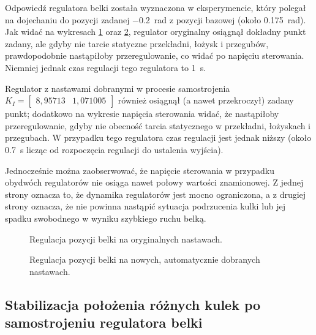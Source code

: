 Odpowiedź regulatora belki została wyznaczona w eksperymencie, który polegał na dojechaniu do pozycji zadanej \SI{-0.2}{\radian} z pozycji bazowej (około \SI{0.175}{\radian}). Jak widać na wykresach \cref{fig:stabilizacja_belki_oryg} oraz \cref{fig:stabilizacja_belki_nastrojone}, regulator oryginalny osiągnął dokładny punkt zadany, ale gdyby nie tarcie statyczne przekładni, łożysk i przegubów, prawdopodobnie nastąpiłoby przeregulowanie, co widać po napięciu sterowania. Niemniej jednak czas regulacji tego regulatora to \SI{1}{\second}.

Regulator z nastawami dobranymi w procesie samostrojenia $K_I=\begin{bmatrix}
8,95713 & 1,071005
\end{bmatrix}$ również osiągnął (a nawet przekroczył) zadany punkt; dodatkowo na wykresie napięcia sterowania widać, że nastąpiłoby przeregulowanie, gdyby nie obecność tarcia statycznego w przekładni, łożyskach i przegubach. W przypadku tego regulatora czas regulacji jest jednak niższy (około \SI{0.7}{\second} licząc od rozpoczęcia regulacji do ustalenia wyjścia).

Jednocześnie można zaobserwować, że napięcie sterowania w przypadku obydwóch regulatorów nie osiąga nawet połowy wartości znamionowej. Z jednej strony oznacza to, że dynamika regulatorów jest mocno ograniczona, a z drugiej strony oznacza, że nie powinna nastąpić sytuacja podrzucenia kulki lub jej spadku swobodnego w wyniku szybkiego ruchu belką.

\begin{figure}[p]
    
    \caption{Regulacja pozycji belki na oryginalnych nastawach.}
    \label{fig:stabilizacja_belki_oryg}
\end{figure}
\begin{figure}[p]
    
    \caption{Regulacja pozycji belki na nowych, automatycznie dobranych nastawach.}
    \label{fig:stabilizacja_belki_nastrojone}
\end{figure}

\subsection{Stabilizacja położenia różnych kulek po samostrojeniu regulatora belki}
\label{subsec:ch9_stabilizacja_polozenia_roznych_kulek_po_samostrojeniu}

